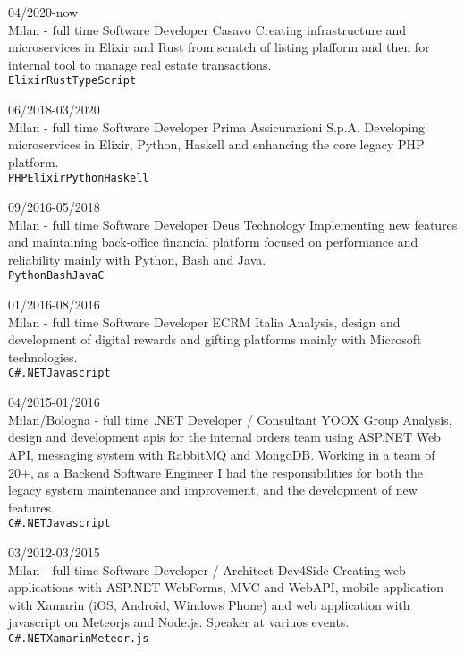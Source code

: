 \documentclass[9pt]{developercv}
\begin{document}
\begin{entrylist}
	\entry
		{04/2020-now\\\footnotesize{Milan - full time}}
		{Software Developer}
		{Casavo}
		{Creating infrastructure and microservices in Elixir and Rust from scratch of listing plafform and then for internal tool to manage real estate transactions. \\
	   \texttt{Elixir}\slashsep\texttt{Rust}\slashsep\texttt{TypeScript}}

	\entry
		{06/2018-03/2020\\\footnotesize{Milan - full time}}
		{Software Developer}
		{Prima Assicurazioni S.p.A.}
		{Developing microservices in Elixir, Python, Haskell and enhancing the core legacy PHP platform. \\ \texttt{PHP}\slashsep\texttt{Elixir}\slashsep\texttt{Python}\slashsep\texttt{Haskell}}

	\entry
		{09/2016-05/2018\\\footnotesize{Milan - full time}}
		{Software Developer}
		{Deus Technology}
		{Implementing new features and maintaining back-office financial platform focused on performance and reliability mainly with Python, Bash and Java. \\ \texttt{Python}\slashsep\texttt{Bash}\slashsep\texttt{Java}\slashsep\texttt{C}}

	\entry
		{01/2016-08/2016\\\footnotesize{Milan - full time}}
		{Software Developer}
		{ECRM Italia}
		{Analysis, design and development of digital rewards and gifting platforms mainly with Microsoft technologies. \\
	   \texttt{C\#}\slashsep\texttt{.NET}\slashsep\texttt{Javascript}}

	\entry
		{04/2015-01/2016\\\footnotesize{Milan/Bologna - full time}}
		{.NET Developer / Consultant}
		{YOOX Group}
		{Analysis, design and development apis for the internal orders team using ASP.NET Web API, messaging system with RabbitMQ and MongoDB. Working in a team of 20+, as a Backend Software Engineer I had the responsibilities for both the legacy system maintenance and improvement, and the development of new features. \\
	   \texttt{C\#}\slashsep\texttt{.NET}\slashsep\texttt{Javascript}}

	\entry
		{03/2012-03/2015\\\footnotesize{Milan - full time}}
		{Software Developer / Architect}
		{Dev4Side}
		{Creating web applications with ASP.NET WebForms, MVC and WebAPI, mobile application with Xamarin (iOS, Android, Windows Phone) and web application with javascript on Meteorjs and Node.js. Speaker at variuos events. \\
	   \texttt{C\#}\slashsep\texttt{.NET}\slashsep\texttt{Xamarin}\slashsep\texttt{Meteor.js}}
\end{entrylist}
\end{document}

